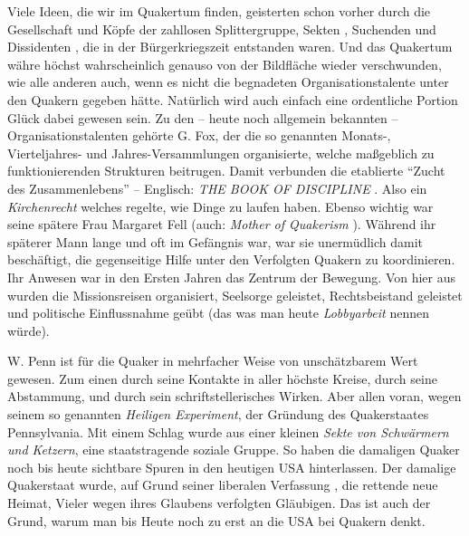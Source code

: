 Viele Ideen, die wir im Quakertum finden, geisterten schon vorher durch die
Gesellschaft und Köpfe der zahllosen Splittergruppe, Sekten
, Suchenden und
Dissidenten , die in der Bürgerkriegszeit
 entstanden waren. Und das Quakertum
währe höchst wahrscheinlich genauso von der Bildfläche wieder verschwunden, wie
alle anderen auch, wenn es nicht die begnadeten Organisationstalente unter den
Quakern gegeben hätte. Natürlich wird auch einfach eine ordentliche Portion
Glück
dabei gewesen sein. Zu den -- heute noch allgemein bekannten --
Organisationstalenten gehörte G. Fox, der die so genannten Monats-,
Vierteljahres-
und Jahres-Versammlungen  
 organisierte, welche maßgeblich zu
funktionierenden
Strukturen beitrugen. Damit verbunden die etablierte "`Zucht des
Zusammenlebens"' 
--
Englisch: \textit{THE BOOK OF DISCIPLINE}  . Also ein
\textit{Kirchenrecht}  welches
regelte, wie Dinge zu laufen haben. Ebenso wichtig war seine spätere Frau
Margaret Fell  (auch: \textit{Mother of
Quakerism} ). Während ihr späterer Mann
lange und oft im Gefängnis war, war sie unermüdlich damit beschäftigt, die
gegenseitige Hilfe unter den Verfolgten  Quakern zu
koordinieren. Ihr Anwesen
war in den Ersten Jahren das Zentrum der Bewegung. Von hier aus wurden die
Missionsreisen organisiert, Seelsorge  geleistet,
Rechtsbeistand geleistet und
politische Einflussnahme  geübt (das was man heute
\textit{Lobbyarbeit}  nennen
würde).

\medskip

W. Penn ist für die Quaker in mehrfacher Weise von unschätzbarem Wert gewesen.
Zum einen durch seine Kontakte in aller höchste Kreise, durch seine Abstammung,
und
durch sein schriftstellerisches Wirken. Aber allen voran, wegen seinem so
genannten \textit{Heiligen Experiment}, der
Gründung des Quakerstaates  
Pennsylvania. Mit einem Schlag wurde aus einer kleinen \textit{Sekte von
Schwärmern und Ketzern}, eine staatstragende soziale Gruppe. So haben die
damaligen Quaker noch bis heute sichtbare Spuren in den heutigen USA
hinterlassen.
Der damalige Quakerstaat wurde, auf Grund seiner liberalen Verfassung
, die
rettende neue Heimat, Vieler wegen ihres Glaubens verfolgten Gläubigen. Das ist
auch der Grund, warum man bis Heute noch zu erst an die USA bei Quakern denkt.

